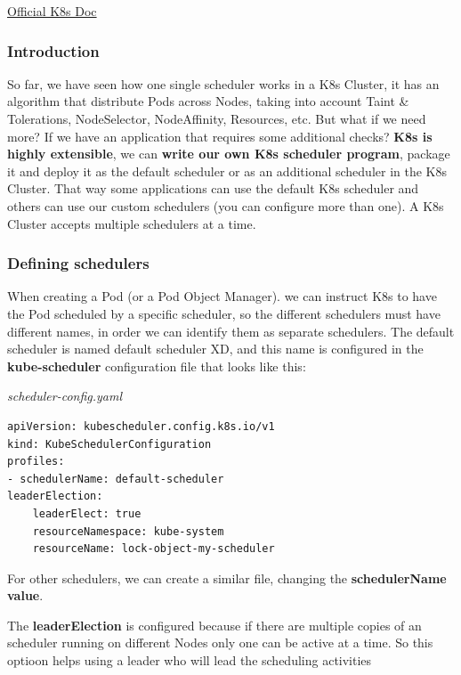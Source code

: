 \documentclass{article}
\newenvironment{codetemplate}[1][]{%
  \mybasecolorbox[#1]
  \itshape
}{%
  \endmybasecolorbox
}
\begin{document}
\href{https://kubernetes.io/docs/tasks/extend-kubernetes/configure-multiple-schedulers/}{Official K8s Doc}

\subsubsection{Introduction}

So far, we have seen how one single scheduler works in a K8s Cluster, it has an algorithm that distribute Pods across Nodes, taking into account Taint \& Tolerations, NodeSelector, NodeAffinity, Resources, etc. But what if we need more? If we have an application that requires some additional checks? \textbf{K8s is highly extensible}, we can\textbf{ write our own K8s scheduler program}, package it and deploy it as the default scheduler or as an additional scheduler in the K8s Cluster. That way some applications can use the default K8s scheduler and others can use our custom schedulers (you can configure more than one). A K8s Cluster accepts multiple schedulers at a time.

\subsubsection{Defining schedulers}

When creating a Pod (or a Pod Object Manager). we can instruct K8s to have the Pod scheduled by a specific scheduler, so the different schedulers must have different names, in order we can identify them as separate schedulers. The default scheduler is named default scheduler XD, and this name is configured in the \textbf{kube-scheduler} configuration file that looks like this:

\begin{codetemplate}{scheduler-config.yaml}
\begin{verbatim}
apiVersion: kubescheduler.config.k8s.io/v1
kind: KubeSchedulerConfiguration
profiles:
- schedulerName: default-scheduler
leaderElection:
    leaderElect: true
    resourceNamespace: kube-system
    resourceName: lock-object-my-scheduler
\end{verbatim}
\end{codetemplate}

For other schedulers, we can create a similar file, changing the \textbf{schedulerName value}.

The \textbf{leaderElection} is configured because if there are multiple copies of an scheduler running on different Nodes only one can be active at a time. So this optioon helps using a leader who will lead the scheduling activities
\end{document}
